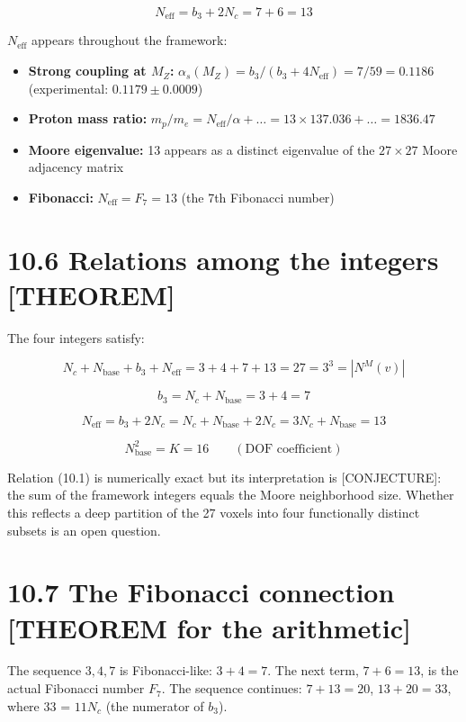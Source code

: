 \documentclass[
  11pt,
  letterpaper,
  twoside,
  openright]{book}
\providecommand{\tightlist}{%
  \setlength{\itemsep}{0pt}\setlength{\parskip}{0pt}}
\begin{document}
\[
N_{\text{eff}} = b_3 + 2N_c = 7 + 6 = 13
\]

\(N_{\text{eff}}\) appears throughout the framework:

\begin{itemize}
\tightlist
\item
  \textbf{Strong coupling at \(M_Z\):}
  \(\alpha_s(M_Z) = b_3 / (b_3 + 4N_{\text{eff}}) = 7/59 = 0.1186\)
  (experimental: \(0.1179 \pm 0.0009\))
\item
  \textbf{Proton mass ratio:}
  \(m_p/m_e = N_{\text{eff}}/\alpha + \ldots = 13 \times 137.036 + \ldots = 1836.47\)
\item
  \textbf{Moore eigenvalue:} 13 appears as a distinct eigenvalue of the
  \(27 \times 27\) Moore adjacency matrix
\item
  \textbf{Fibonacci:} \(N_{\text{eff}} = F_7 = 13\) (the 7th Fibonacci
  number)
\end{itemize}

\section{10.6 Relations among the integers
{[}THEOREM{]}}\label{relations-among-the-integers-theorem}

The four integers satisfy:

\[
N_c + N_{\text{base}} + b_3 + N_{\text{eff}} = 3 + 4 + 7 + 13 = 27 = 3^3 = |N^M(v)|
\tag{10.1}
\]

\[
b_3 = N_c + N_{\text{base}} = 3 + 4 = 7
\tag{10.2}
\]

\[
N_{\text{eff}} = b_3 + 2N_c = N_c + N_{\text{base}} + 2N_c = 3N_c + N_{\text{base}} = 13
\tag{10.3}
\]

\[
N_{\text{base}}^2 = K = 16 \qquad (\text{DOF coefficient})
\tag{10.4}
\]

Relation (10.1) is numerically exact but its interpretation is
{[}CONJECTURE{]}: the sum of the framework integers equals the Moore
neighborhood size. Whether this reflects a deep partition of the 27
voxels into four functionally distinct subsets is an open question.

\section{10.7 The Fibonacci connection {[}THEOREM for the
arithmetic{]}}\label{the-fibonacci-connection-theorem-for-the-arithmetic}

The sequence \(3, 4, 7\) is Fibonacci-like: \(3 + 4 = 7\). The next
term, \(7 + 6 = 13\), is the actual Fibonacci number \(F_7\). The
sequence continues: \(7 + 13 = 20\), \(13 + 20 = 33\), where 33 =
\(11 N_c\) (the numerator of \(b_3\)).
\end{document}
